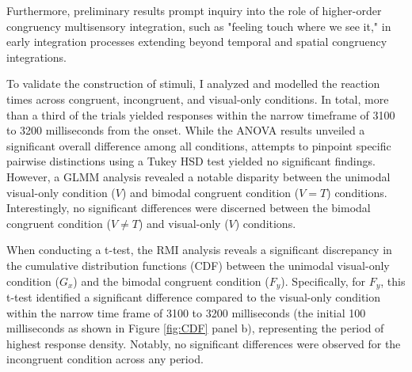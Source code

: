 \documentclass[12pt,oneside,openright]{report}
\begin{document}
Furthermore, preliminary results prompt inquiry into the role of higher-order congruency multisensory integration, such as "feeling touch where we see it," in early integration processes extending beyond temporal and spatial congruency integrations.



To validate the construction of stimuli, I analyzed and modelled the reaction times across congruent, incongruent, and visual-only conditions. In total, more than a third of the trials yielded responses within the narrow timeframe of 3100 to 3200 milliseconds from the onset. While the ANOVA results unveiled a significant overall difference among all conditions, attempts to pinpoint specific pairwise distinctions using a Tukey HSD test yielded no significant findings. However, a GLMM analysis revealed a notable disparity between the unimodal visual-only condition ($V$) and bimodal congruent condition ($V=T$) conditions. Interestingly, no significant differences were discerned between the bimodal congruent condition ($V \neq T$) and visual-only ($V$) conditions.

When conducting a t-test, the RMI analysis reveals a significant discrepancy in the cumulative distribution functions (CDF) between the unimodal visual-only condition ($G_x$) and the bimodal congruent condition ($F_y$). Specifically, for $F_y$, this t-test identified a significant difference compared to the visual-only condition within the narrow time frame of 3100 to 3200 milliseconds (the initial 100 milliseconds as shown in Figure \ref{fig:CDF} panel b), representing the period of highest response density. Notably, no significant differences were observed for the incongruent condition across any period.
\end{document}
